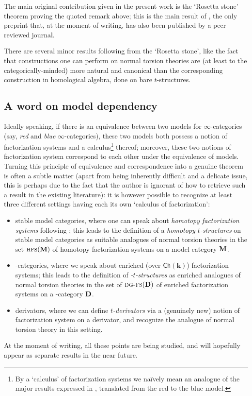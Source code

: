 The main original contribution given in the present work is the `Rosetta stone' theorem proving the quoted remark above; this is the main result of \cite{FL0}, the only preprint that, at the moment of writing, has also been published by a peer\hyp{}reviewed journal.

There are several minor results following from the `Rosetta stone', like the fact that constructions one can perform on normal torsion theories are (at least to the categorically\hyp{}minded) more natural and canonical than the corresponding construction in homological algebra, done on bare $t$\hyp{}structures.
\subsection*{A word on model dependency}\label{sec:model.dep}
Ideally speaking, if there is an equivalence between two models for $\infty$\hyp{}categories (say, \emph{red} and \emph{blue} $\infty$\hyp{}categories), these two models both possess a notion of factorization systems and a calculus\footnote{By a `calculus' of factorization systems we na\"ively mean an analogue of the major results expressed in \achap {}, translated from the red to the blue model.} thereof; moreover, these two notions of factorization system correspond to each other under the equivalence of models. Turning this principle of equivalence and correspondence into a genuine theorem is often a subtle matter (apart from being inherently difficult and a delicate issue, this is perhaps due to the fact that the author is ignorant of how to retrieve such a result in the existing literature): it is however possible to recognize at least three different settings having each its own `calculus of factorization':
\begin{itemize}
\item stable model categories, where one can speak about \emph{homotopy factorization systems} following \cite{bousfield1977constructions,Joy}; this leads to the definition of a \emph{homotopy $t$\hyp{}structures} on stable model categories as suitable analogues of normal torsion theories in the set $\text{\scshape hfs}(\mathbf{M})$ of homotopy factorization systems on a model category $\mathbf{M}$.
\item \dg\hyp{}categories, where we speak about enriched (over $\textsf{Ch}(\mathbf{k})$) factorization systems; this leads to the definition of \emph{\hyp{}$t$\hyp{}structures} as enriched analogues of normal torsion theories in the set of $\text{\scshape dg-fs}(\mathbf{D})$ of enriched factorization systems on a \dg\hyp{}category $\mathbf{D}$.
\item derivators, where we can define \emph{$t$\hyp{}derivators} via a (genuinely new) notion of factorization system on a derivator, and recognize the analogue of normal torsion theory in this setting.
\end{itemize}
At the moment of writing, all these points are being studied, and will hopefully appear as separate results in the near future.
